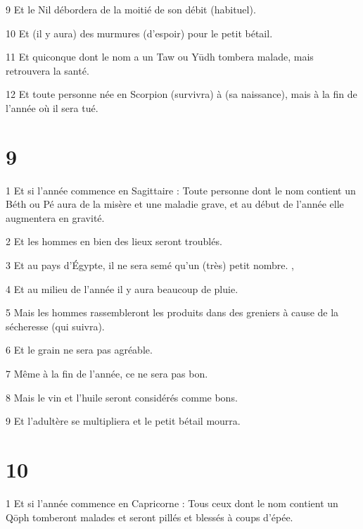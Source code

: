 \par 9 Et le Nil débordera de la moitié de son débit (habituel).

\par 10 Et (il y aura) des murmures (d'espoir) pour le petit bétail.

\par 11 Et quiconque dont le nom a un Taw ou Yūdh tombera malade, mais retrouvera la santé.

\par 12 Et toute personne née en Scorpion (survivra) à (sa naissance), mais à la fin de l'année où il sera tué.

\chapter{9}

\par 1 Et si l'année commence en Sagittaire : Toute personne dont le nom contient un Béth ou Pé aura de la misère et une maladie grave, et au début de l'année elle augmentera en gravité.

\par 2 Et les hommes en bien des lieux seront troublés.

\par 3 Et au pays d'Égypte, il ne sera semé qu'un (très) petit nombre. ,

\par 4 Et au milieu de l'année il y aura beaucoup de pluie.

\par 5 Mais les hommes rassembleront les produits dans des greniers à cause de la sécheresse (qui suivra).

\par 6 Et le grain ne sera pas agréable.

\par 7 Même à la fin de l'année, ce ne sera pas bon.

\par 8 Mais le vin et l'huile seront considérés comme bons.

\par 9 Et l'adultère se multipliera et le petit bétail mourra.

\chapter{10}

\par 1 Et si l'année commence en Capricorne : Tous ceux dont le nom contient un Qōph tomberont malades et seront pillés et blessés à coups d'épée.

